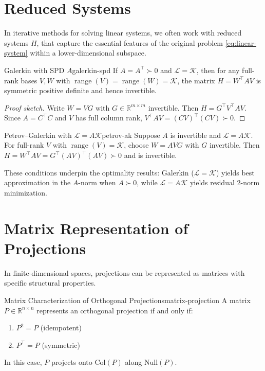 \section{Reduced Systems}
In iterative methods for solving linear systems, we often work with reduced systems $H$, that capture the essential features of the original problem \eqref{eq:linear-system} within a lower-dimensional subspace.

\begin{proposition}{Galerkin with SPD $A$}{galerkin-spd}
    If $A=A^\top\succ0$ and $\mathcal{L}=\mathcal{K}$, then for any full-rank bases $V,W$ with $\operatorname{range}(V)=\operatorname{range}(W)=\mathcal{K}$, the matrix $H=W^\top A V$ is symmetric positive definite and hence invertible.
\end{proposition}
\begin{proof}[Proof sketch]
    Write $W=VG$ with $G\in\mathbb{R}^{m\times m}$ invertible. Then $H=G^\top V^\top A V$. Since $A=C^\top C$ and $V$ has full column rank, $V^\top A V=(CV)^\top(CV)\succ0$.
\end{proof}

\begin{proposition}{Petrov--Galerkin with $\mathcal{L}=A\mathcal{K}$}{petrov-ak}
    Suppose $A$ is invertible and $\mathcal{L}=A\mathcal{K}$. For full-rank $V$ with $\operatorname{range}(V)=\mathcal{K}$, choose $W=AVG$ with $G$ invertible. Then $H=W^\top A V = G^\top (AV)^\top(AV)\succ0$ and is invertible.
\end{proposition}

These conditions underpin the optimality results: Galerkin ($\mathcal{L}=\mathcal{K}$) yields best approximation in the $A$-norm when $A\succ0$, while $\mathcal{L}=A\mathcal{K}$ yields residual 2-norm minimization.

\section{Matrix Representation of Projections}

In finite-dimensional spaces, projections can be represented as matrices with specific structural properties.

\begin{theorem}{Matrix Characterization of Orthogonal Projections}{matrix-projection}
    A matrix $P  \in  \mathbb{R}^{n \times n}$ represents an orthogonal projection if and only if:
    \begin{enumerate}
        \item $P^2 = P$ (idempotent)
        \item $P^{\top} = P$ (symmetric)
    \end{enumerate}
    In this case, $P$ projects onto $\text{Col}(P)$ along $\text{Null}(P)$.
\end{theorem}

